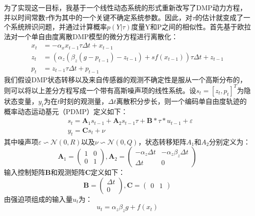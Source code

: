 为了实现这一目标，我基于一个线性动态系统的形式重新改写了DMP动力方程，并以时间常数$τ$作为其中的一个关键不确定系统参数。因此，对$τ$的估计就变成了一个系统辨识问题，并通过计算概率$p(Y|τ)$度量Y和P之间的相似性。首先基于欧拉法对一个单自由度离散DMP模型的微分方程进行离散化：
\begin{equation}
    \begin{aligned}
    x_t & =-\alpha_x x_{t-1} \tau \Delta t+x_{t-1} \\
    z_t & =\left(\alpha_z\left(\beta_z\left(g-p_{t-1}\right)-z_{t-1}\right)+s f\left(x_{t-1}\right)\right) \tau \Delta t+z_{t-1} \\
    p_t & =z_{t-1} \tau \Delta t+p_{t-1}
    \end{aligned}
\end{equation}
我们假设DMP状态转移以及来自传感器的观测不确定性是服从一个高斯分布的，则可以将以上差分方程写成一个带有高斯噪声项的线性系统。设$s_t = [z_t,p_t]^T$为隐状态变量，$y_t$为在$t$时刻的观测量，$\Delta t$离散积分步长，则一个编码单自由度轨迹的概率动态运动基元（PDMP）定义如下：
\begin{equation}
    \begin{aligned}
    & s_t=\mathbf{A}_1 s_{t-1}+\mathbf{A}_2 s_{t-1} \tau+\mathbf{B} * \tau * u_{t-1}+\varepsilon \\
    & y_t=\mathbf{C} s_t+\nu
    \end{aligned}
    \label{eq:4-12}
\end{equation}
其中噪声项$\varepsilon \backsim \mathcal N(0,R)$以及$\nu \backsim \mathcal N(0,Q)$，状态转移矩阵$A_1$和$A_2$分别定义为：
\begin{equation}
    \mathbf{A}_1=\left(\begin{array}{ll}
    1 & 0 \\
    0 & 1
    \end{array}\right), \mathbf{A}_2=\left(\begin{array}{cc}
    -\alpha_z \Delta t & -\alpha_z \beta_z \Delta t \\
    \Delta t & 0
    \end{array}\right)
\end{equation}
输入控制矩阵$\mathbf{B}$和观测矩阵$\mathbf{C}$定义如下：
\begin{equation}
    \mathbf{B}=\left(\begin{array}{c}
    \Delta t \\
    0
    \end{array}\right), \mathbf{C}=\left(\begin{array}{ll}
    0 & 1
    \end{array}\right)
\end{equation}
由强迫项组成的输入量$u_t$为：
\begin{equation}
    u_t=\alpha_z \beta_z g+ f\left(x_t\right)
\end{equation}

